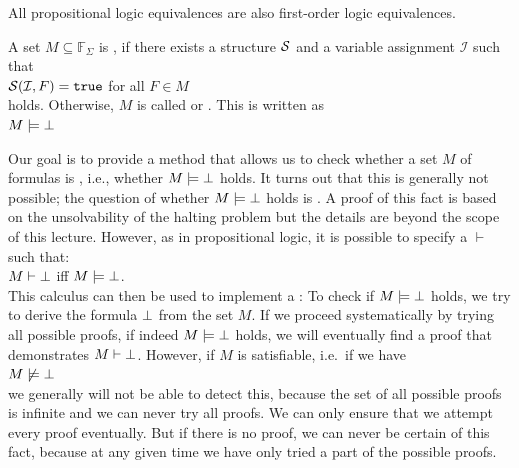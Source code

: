 \remarkEng
All propositional logic equivalences are also first-order logic equivalences.
\eox

\begin{Definition}[Satisfiable]
    A set $M \subseteq \mathbb{F}_\Sigma$ is ,
    if there exists a structure $\mathcal{S}$ and a variable assignment $\mathcal{I}$ such that 
    \\[0.2cm]
    \hspace*{1.3cm}
    $\mathcal{S}(\mathcal{I},F) = \mathtt{true}$ \quad for all $F \in M$ 
    \\[0.2cm]
    holds. Otherwise, $M$ is called  or .
    This is written as \\[0.2cm]
    \hspace*{1.3cm} $M \models \bot$ 
    \eox
\end{Definition}

\noindent
Our goal is to provide a method that allows us to check
whether a set $M$ of formulas is , i.e., whether 
$M \models \bot$ holds. It turns out that this is generally not
possible; the question of whether $M \models \bot$ holds is . A proof
of this fact is based on the unsolvability of the halting problem but the details are beyond the scope of
this lecture. 
However, as in propositional logic, it is possible
to specify a  $\vdash$ such that: \\[0.2cm]
\hspace*{1.3cm} $M \vdash \bot$ \quad iff \quad $M \models \bot$. \\[0.2cm]
This calculus can then be used to implement a
: To check if
$M \models \bot$ holds, we try to derive the formula $\bot$
from the set $M$.
If we proceed systematically by trying all possible proofs,
if indeed $M \models \bot$ holds, we will eventually find a proof
that demonstrates $M \vdash \bot$. However, if $M$ is satisfiable, i.e.~if we have  \\[0.2cm]
\hspace*{1.3cm}  $M \not\models \bot$ \\[0.2cm]
we generally will not be able to detect this, because the set of all possible proofs is infinite
and we can never try all proofs. We can only ensure that
we attempt every proof eventually. But if there is no proof, we can
never be certain of this fact, because at any given time we have only tried a part of the
possible proofs.

